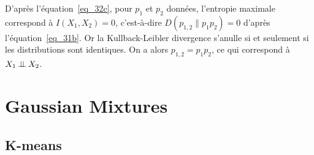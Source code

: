 \documentclass[12pt,a4paper,onecolumn]{article}
\begin{document}
D'après l'équation~\eqref{eq_32c}, pour \(p_1\) et \(p_2\) données, l'entropie maximale correspond à \(I(X_1, X_2) = 0\), c'est-à-dire \(D(p_{1, 2} \parallel p_1p_2) = 0\) d'après l'équation~\eqref{eq_31b}. Or la Kullback-Leibler divergence s'anulle si et seulement si les distributions sont identiques. On a alors \(p_{1,2} = p_1p_2\), ce qui correspond à \(X_1 \,\bot\!\!\!\bot\, X_2\).

\section{Gaussian Mixtures}

\subsection{K-means}
\end{document}

